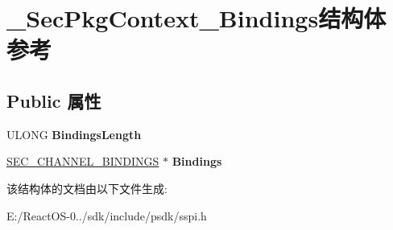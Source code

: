 \hypertarget{struct___sec_pkg_context___bindings}{}\section{\+\_\+\+Sec\+Pkg\+Context\+\_\+\+Bindings结构体 参考}
\label{struct___sec_pkg_context___bindings}
\subsection*{Public 属性}
\begin{DoxyCompactItemize}
\item 
\mbox{\label{struct___sec_pkg_context___bindings_acd4e8ddf77619a3134e60e92a6b20ed2}} 
U\+L\+O\+NG {\bfseries Bindings\+Length}
\item 
\mbox{\label{struct___sec_pkg_context___bindings_a0170cd45d609e3b9e654e6edf70aca91}} 
\hyperlink{struct___s_e_c___c_h_a_n_n_e_l___b_i_n_d_i_n_g_s}{S\+E\+C\+\_\+\+C\+H\+A\+N\+N\+E\+L\+\_\+\+B\+I\+N\+D\+I\+N\+GS} $\ast$ {\bfseries Bindings}
\end{DoxyCompactItemize}


该结构体的文档由以下文件生成\+:\begin{DoxyCompactItemize}
\item 
E\+:/\+React\+O\+S-\/0../sdk/include/psdk/sspi.\+h\end{DoxyCompactItemize}
